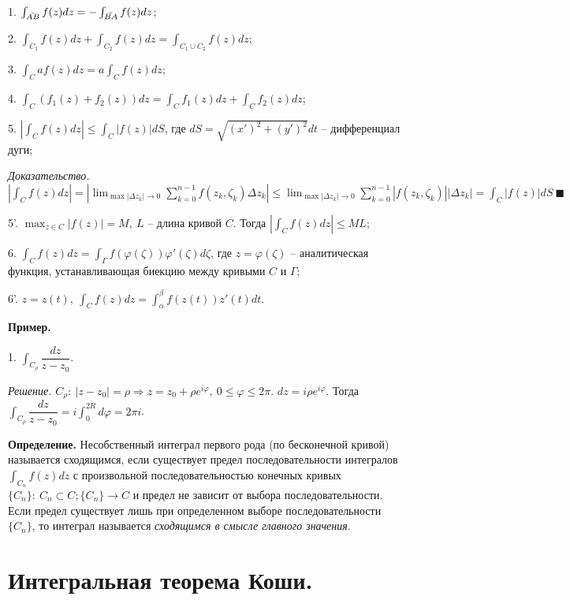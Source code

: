 \documentclass[9pt]{article}
\begin{document}
\ 
\par1. \(\int_{\Breve{AB}} f(z)dz=-\int_{\Breve{BA}} f(z)dz\);
\par2. \(\int_{C_1}f(z)dz+\int_{C_2}f(z)dz=\int_{C_1\cup C_2}f(z)dz\);
\par3. \(\int_Caf(z)dz=a\int_Cf(z)dz\);
\par4. \(\int_C(f_1(z)+f_2(z))dz=\int_Cf_1(z)dz+\int_Cf_2(z)dz\);
\par5. \(|\int_Cf(z)dz|\le\int_C|f(z)|dS\), где \(dS=\sqrt{(x')^2+(y')^2}dt\) -- дифференциал дуги;
\par\textit{Доказательство.} \(|\int_Cf(z)dz|=|\displaystyle\lim_{\max|\Delta z_k|\to0}\sum_{k=0}^{n-1}f(z_k,\zeta_k)\Delta z_k|\le\displaystyle\lim_{\max|\Delta z_k|\to0}\sum_{k=0}^{n-1}|f(z_k,\zeta_k)||\Delta z_k|=\int_C|f(z)|dS\ \blacksquare\)
\par5'. \(\displaystyle\max_{z\in C}|f(z)|=M,\ L\) -- длина кривой \(C\). Тогда \(|\int_Cf(z)dz|\le ML\);
\par6. \(\int_Cf(z)dz=\int_\Gamma f(\varphi(\zeta))\varphi'(\zeta)d\zeta\), где \(z=\varphi(\zeta)\) -- аналитическая функция, устанавливающая биекцию между кривыми \(C\) и \(\Gamma\);
\par6'. \(z=z(t),\ \int_Cf(z)dz=\int_\alpha^\beta f(z(t))z'(t)dt\).
\par\textbf{Пример.}
\par1. \(\int_{C_\rho}\dfrac{dz}{z-z_0}\).
\par\textit{Решение.} \(C_\rho:\ |z-z_0|=\rho\Rightarrow z=z_0+\rho e^{i\varphi},\ 0\le\varphi\le 2\pi\). \(dz=i\rho e^{i\varphi}\). Тогда \(\int_{C_\rho}\dfrac{dz}{z-z_0}=i\int_0^{2R}d\varphi=2\pi i\).
\newline
\newline
\par\textbf{Определение.} Несобственный интеграл первого рода (по бесконечной кривой) называется сходящимся, если существует предел последовательности интегралов \(\int_{C_n}f(z)dz\) с произвольной последовательностью конечных кривых \(\{C_n\}:\ C_n\subset C; \{C_n\}\to C\) и предел не зависит от выбора последовательности. Если предел существует лишь при определенном выборе последовательности \(\{C_n\}\), то интеграл называется \textit{сходящимся в смысле главного значения}.

\section{Интегральная теорема Коши.}
\end{document}
